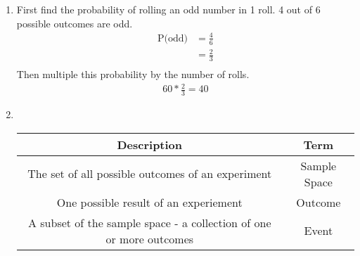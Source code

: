\documentclass[11pt]{article}
\begin{document}
\begin{enumerate}
\begin{enumerate}
            \item First find the probability of rolling an odd number in 1 roll. 4 out of 6 possible outcomes are odd.
            \begin{equation*}
                \begin{split}
                    \text{P(odd)}&=\frac{4}{6}\\
                    &=\frac{2}{3}\\
                \end{split}
            \end{equation*}
            Then multiple this probability by the number of rolls.
            \begin{equation*}
                \begin{split}
                    60*\frac{2}{3}=40
                \end{split}
            \end{equation*}
            \item \ 
                \begin{center}
                    \begin{tabular}{|c|c|} 
                        \hline
                        Description&Term\\
                        \hline
                        The set of all possible outcomes of an experiment&Sample Space\\
                        One possible result of an experiement&Outcome\\
                        A subset of the sample space - a collection of one or more outcomes&Event\\
                        \hline
                    \end{tabular}
                \end{center}
        \end{enumerate}


\end{enumerate}
\end{document}
